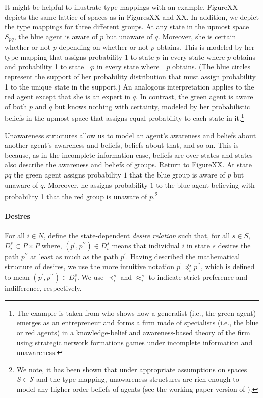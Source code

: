 \documentclass[
11pt,
titlepage,
reqno,
]{article}%
\theoremstyle{definition}
\begin{document}
	It might be helpful to illustrate type mappings with an example. FigureXX depicts the same lattice of spaces as in FiguresXX and XX. In addition, we depict the type mappings for three different groups. At any state in the upmost space $S_{pq}$, the blue agent is aware of $p$ but unaware of $q$. Moreover, she is certain whether or not $p$ depending on whether or not $p$ obtains. This is modeled by her type mapping that assigns probability 1 to state $p$ in every state where $p$ obtains and probability 1 to state $\neg p$ in every state where $\neg p$ obtains. (The blue circles represent the support of her probability distribution that must assign probability 1 to the unique state in the support.) An analogous interpretation applies to the red agent except that she is an expert in $q$. In contrast, the green agent is aware of both $p$ and $q$ but knows nothing with certainty, modeled by her probabilistic beliefs in the upmost space that assigns equal probability to each state in it.\footnote{The example is taken from \citet{Schipper2016} who shows how a generalist (i.e., the green agent) emerges as an entrepreneur and forms a firm made of specialists (i.e., the blue or red agents) in a knowledge-belief and awareness-based theory of the firm using strategic network formations games under incomplete information and unawareness.}
	
	Unawareness structures allow us to model an agent's awareness and beliefs about another agent's awareness and beliefs, beliefs about that, and so on. This is because, as in the incomplete information case,  beliefs are over states and states also describe the awareness and beliefs of groups.  Return to FigureXX. At state $pq$ the green agent assigns probability $1$ that the blue group is aware of $p$ but unaware of $q$. Moreover, he assigns probability $1$ to the blue agent believing with probability 1 that the red group is unaware of $p$.\footnote{We  note, it has been shown that under appropriate assumptions on spaces $S \in \mathcal{S}$ and the type mapping, unawareness structures are rich enough to model any higher order beliefs of agents (see the working paper version of \citet{Heifetz2013}).}
	
	\paragraph{Desires \label{para: desires}}
	For all $i\in N$, define the state-dependent \textit{desire relation} such that, for all $s\in S$,   $D_i^s\subset P\times P$ where, $(p^\prime,p^{\prime\prime})\in D_i^s$ means that  individual $i$ in state $s$ desires the path $p^{\prime\prime}$ at least as much as the path $p^\prime$. 
	Having described the mathematical structure of desires, we use the more intuitive notation $p^\prime\preceq_i^s p^{\prime\prime}$, which is defined to mean $(p^\prime,p^{\prime\prime})\in D_i^s$. 
	We use $\prec_i^s$ and $\approx_i^s$ to indicate strict preference and indifference, respectively. 
	
\end{document}
